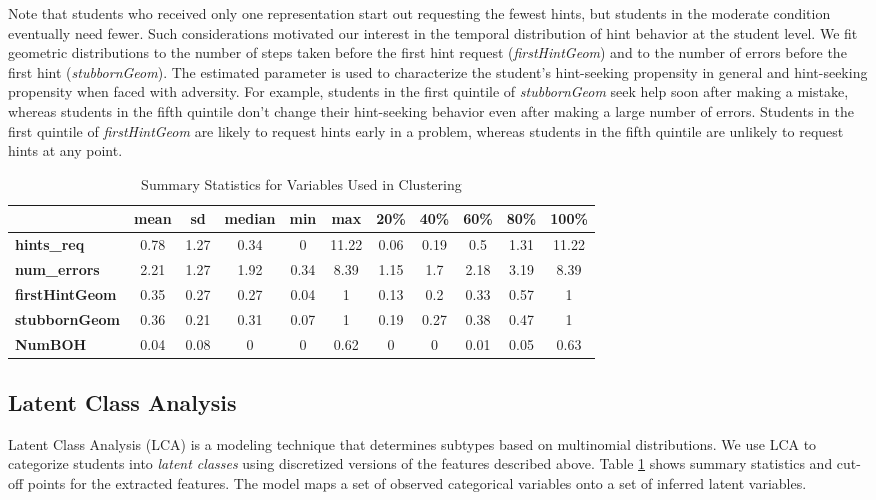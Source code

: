 \documentclass{edm_template}
\begin{document}
Note that students who received only one representation start out requesting the fewest hints, but students in the moderate condition eventually need fewer. Such considerations motivated our interest in the temporal distribution of hint behavior at the student level. We fit geometric distributions to the number of steps taken before the first hint request (\emph{firstHintGeom}) and to the number of errors before the first hint (\emph{stubbornGeom}). The estimated parameter is used to characterize the student's hint-seeking propensity in general and hint-seeking propensity when faced with adversity. For example, students in the first quintile of \emph{stubbornGeom} seek help soon after making a mistake, whereas students in the fifth quintile don't change their hint-seeking behavior even after making a large number of errors. Students in the first quintile of \emph{firstHintGeom} are likely to request hints early in a problem, whereas students in the fifth quintile are unlikely to request hints at any point.
\begin{table}[htbp]
\caption{Summary Statistics for Variables Used in Clustering}
\begin{center}
\begin{tabular}{| l || c | c || c | c | c || c | c | c | c | c |}
\hline
&mean& sd&median&min&max&20\%&40\%&60\%&	80\%&100\%\\ \hline \hline
\textbf{hints\_req}&0.78&1.27&0.34&0&11.22&0.06&0.19&0.5&1.31&11.22\\ \hline
\textbf{num\_errors}&2.21&1.27&1.92&0.34&8.39&1.15&1.7&2.18&3.19&8.39\\ \hline 
\textbf{firstHintGeom}&0.35&0.27&0.27&0.04&1&0.13&0.2&0.33&0.57&1\\ \hline
\textbf{stubbornGeom}&0.36&0.21&0.31&0.07&1&0.19&0.27&0.38&0.47&1\\ \hline
\textbf{NumBOH}&0.04&0.08&0&0&0.62&0&0&0.01&0.05&0.63\\ \hline
 \end{tabular}
\end{center}
\label{tab:sumstats}
\end{table}




\subsection{Latent Class Analysis}
\label{sec:LCA}

Latent Class Analysis (LCA) is a modeling technique that determines subtypes based on multinomial distributions. We use LCA to categorize students into \emph{latent classes} using discretized versions of the features described above. Table \ref{tab:sumstats} shows summary statistics and cut-off points for the extracted features. The model maps a set of observed categorical variables onto a set of inferred latent variables. 
\end{document}
